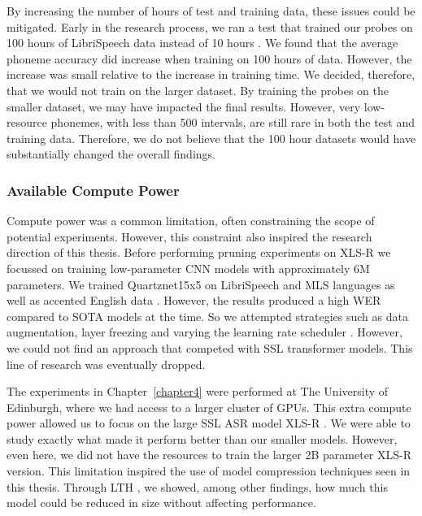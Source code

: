 By increasing the number of hours of test and training data, these issues could be mitigated. Early in the research process, we ran a test that trained our probes on 100 hours of LibriSpeech data instead of 10 hours \cite{librispeech}. We found that the average phoneme accuracy did increase when training on 100 hours of data. However, the increase was small relative to the increase in training time. We decided, therefore, that we would not train on the larger dataset. By training the probes on the smaller dataset, we may have impacted the final results. However, very low-resource phonemes, with less than 500 intervals, are still rare in both the test and training data. Therefore, we do not believe that the 100 hour datasets would have substantially changed the overall findings.

\subsubsection{Available Compute Power}

Compute power was a common limitation, often constraining the scope of potential experiments. However, this constraint also inspired the research direction of this thesis. Before performing pruning experiments on XLS-R we focussed on training low-parameter CNN models with approximately 6M parameters. We trained Quartznet15x5 \cite{quartznet} on LibriSpeech \cite{librispeech} and MLS languages \cite{MLS} as well as accented English data \cite{aesrc2020}. However, the results produced a high WER compared to SOTA models at the time. So we attempted strategies such as data augmentation, layer freezing and varying the learning rate scheduler \cite{some citations here}. However, we could not find an approach that competed with SSL transformer models. This line of research was eventually dropped. 

The experiments in Chapter~\ref{chapter4} were performed at The University of Edinburgh, where we had access to a larger cluster of GPUs. This extra compute power allowed us to focus on the large SSL ASR model XLS-R \cite{babu2021xlsr}. We were able to study exactly what made it perform better than our smaller models. However, even here, we did not have the resources to train the larger 2B parameter XLS-R version. This limitation inspired the use of model compression techniques seen in this thesis. Through LTH \cite{frankle2018LTH}, we showed, among other findings, how much this model could be reduced in size without affecting performance.  

